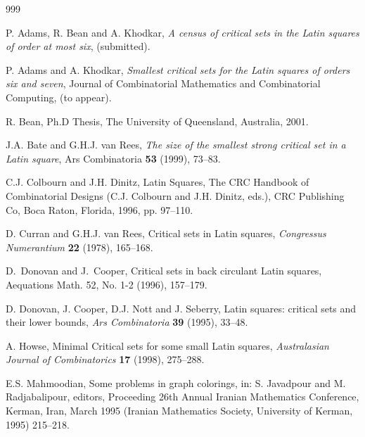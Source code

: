 \documentclass[11pt]{article}
\begin{document}
\begin{thebibliography}{999}

 P. Adams, R. Bean and A. Khodkar, 
{\em A census of critical sets in the Latin squares 
of order at most six}, (submitted).

 P. Adams and A. Khodkar,
{\em Smallest critical sets for the Latin squares of orders six and
seven}, Journal of Combinatorial Mathematics and Combinatorial
Computing, (to appear).

 R. Bean,
Ph.D Thesis, The University of Queensland, Australia, 2001.

 J.A. Bate and G.H.J. van Rees,
{\em The size of the smallest strong critical set in a Latin square},
Ars Combinatoria {\bf 53} (1999), 73--83.

 C.J. Colbourn and J.H. Dinitz,
Latin Squares,
The CRC Handbook of Combinatorial Designs (C.J. Colbourn and
J.H. Dinitz, eds.), CRC Publishing Co, Boca Raton,
Florida, 1996, pp. 97--110.

 D. Curran and G.H.J. van Rees, 
Critical sets in Latin squares,
{\em Congressus Numerantium} {\bf 22} (1978), 165--168.

 D.\ Donovan and J.\ Cooper, Critical sets in back
circulant Latin squares, Aequations Math. 52, No. 1-2 (1996),
157--179.

 D. Donovan, J. Cooper, D.J. Nott and J. Seberry,
Latin squares: critical sets and their lower bounds,
{\em Ars Combinatoria} {\bf 39} (1995), 33--48.

 A. Howse,
Minimal Critical sets for some small Latin squares,
{\em Australasian Journal of Combinatorics} {\bf 17} (1998), 275--288.

 E.S. Mahmoodian, 
Some problems in graph colorings, 
in: S. Javadpour and M. Radjabalipour, editors, 
Proceeding 26th Annual Iranian Mathematics Conference, 
Kerman, Iran, March 1995 (Iranian Mathematics Society, 
University of Kerman, 1995) 215--218.

\end{thebibliography}
\end{document}

